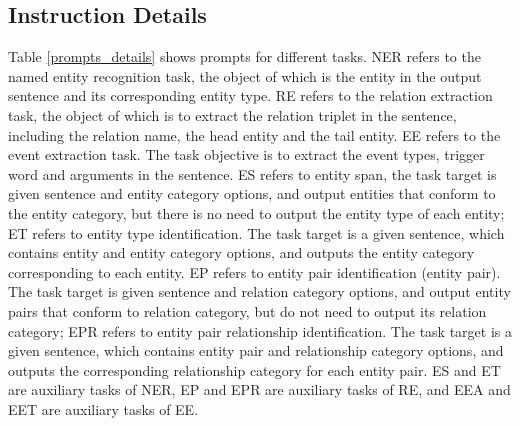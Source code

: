 \subsection{Instruction Details}
Table \ref{prompts_details} shows prompts for different tasks. NER refers to the named entity recognition task, the object of which is the entity in the output sentence and its corresponding entity type. RE refers to the relation extraction task, the object of which is to extract the relation triplet in the sentence, including the relation name, the head entity and the tail entity. EE refers to the event extraction task. The task objective is to extract the event types, trigger word and arguments in the sentence. ES refers to entity span, the task target is given sentence and entity category options, and output entities that conform to the entity category, but there is no need to output the entity type of each entity; ET refers to entity type identification. The task target is a given sentence, which contains entity and entity category options, and outputs the entity category corresponding to each entity. EP refers to entity pair identification (entity pair). The task target is given sentence and relation category options, and output entity pairs that conform to relation category, but do not need to output its relation category; EPR refers to entity pair relationship identification. The task target is a given sentence, which contains entity pair and relationship category options, and outputs the corresponding relationship category for each entity pair. ES and ET are auxiliary tasks of NER, EP and EPR are auxiliary tasks of RE, and EEA and EET are auxiliary tasks of EE.

